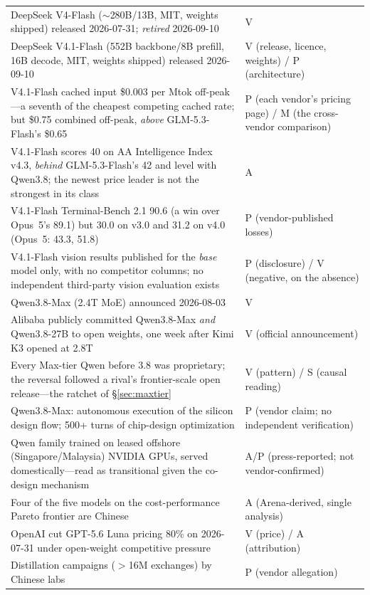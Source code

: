\begin{small}
\begin{longtable}{p{100mm}p{36mm}}
  DeepSeek V4-Flash ($\sim$280B/13B, MIT, weights shipped) released 2026-07-31; \emph{retired} 2026-09-10 & V \\
  DeepSeek V4.1-Flash (552B backbone/8B prefill, 16B decode, MIT, weights shipped) released 2026-09-10 & V (release, licence, weights) / P (architecture) \\
  V4.1-Flash cached input \$0.003 per Mtok off-peak---a seventh of the cheapest competing cached rate; but \$0.75 combined off-peak, \emph{above} GLM-5.3-Flash's \$0.65 & P (each vendor's pricing page) / M (the cross-vendor comparison) \\
  V4.1-Flash scores 40 on AA Intelligence Index v4.3, \emph{behind} GLM-5.3-Flash's 42 and level with Qwen3.8; the newest price leader is not the strongest in its class & A \\
  V4.1-Flash Terminal-Bench 2.1 90.6 (a win over Opus~5's 89.1) but 30.0 on v3.0 and 31.2 on v4.0 (Opus~5: 43.3, 51.8) & P (vendor-published losses) \\
  V4.1-Flash vision results published for the \emph{base} model only, with no competitor columns; no independent third-party vision evaluation exists & P (disclosure) / V (negative, on the absence) \\
  Qwen3.8-Max (2.4T MoE) announced 2026-08-03 & V \\
  Alibaba publicly committed Qwen3.8-Max \emph{and} Qwen3.8-27B to open weights, one week after Kimi K3 opened at 2.8T & V (official announcement) \\
  Every Max-tier Qwen before 3.8 was proprietary; the reversal followed a rival's frontier-scale open release---the ratchet of \S\ref{sec:maxtier} & V (pattern) / S (causal reading) \\
  Qwen3.8-Max: autonomous execution of the silicon design flow; 500+ turns of chip-design optimization & P (vendor claim; no independent verification) \\
  Qwen family trained on leased offshore (Singapore/Malaysia) NVIDIA GPUs, served domestically---read as transitional given the co-design mechanism & A/P (press-reported; not vendor-confirmed) \\
  Four of the five models on the cost-performance Pareto frontier are Chinese & A (Arena-derived, single analysis) \\
  OpenAI cut GPT-5.6 Luna pricing 80\% on 2026-07-31 under open-weight competitive pressure & V (price) / A (attribution) \\
  Distillation campaigns ($>$16M exchanges) by Chinese labs & P (vendor allegation) \\

\end{longtable}
\end{small}
